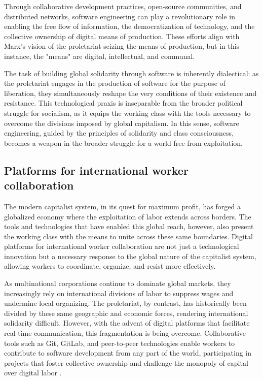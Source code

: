 \begin{refsection}
Through collaborative development practices, open-source communities, and distributed networks, software engineering can play a revolutionary role in enabling the free flow of information, the democratization of technology, and the collective ownership of digital means of production. These efforts align with Marx’s vision of the proletariat seizing the means of production, but in this instance, the "means" are digital, intellectual, and communal.

The task of building global solidarity through software is inherently dialectical: as the proletariat engages in the production of software for the purpose of liberation, they simultaneously reshape the very conditions of their existence and resistance. This technological praxis is inseparable from the broader political struggle for socialism, as it equips the working class with the tools necessary to overcome the divisions imposed by global capitalism. In this sense, software engineering, guided by the principles of solidarity and class consciousness, becomes a weapon in the broader struggle for a world free from exploitation.

\subsection{Platforms for international worker collaboration}

The modern capitalist system, in its quest for maximum profit, has forged a globalized economy where the exploitation of labor extends across borders. The tools and technologies that have enabled this global reach, however, also present the working class with the means to unite across these same boundaries. Digital platforms for international worker collaboration are not just a technological innovation but a necessary response to the global nature of the capitalist system, allowing workers to coordinate, organize, and resist more effectively.

As multinational corporations continue to dominate global markets, they increasingly rely on international divisions of labor to suppress wages and undermine local organizing. The proletariat, by contrast, has historically been divided by these same geographic and economic forces, rendering international solidarity difficult. However, with the advent of digital platforms that facilitate real-time communication, this fragmentation is being overcome. Collaborative tools such as Git, GitLab, and peer-to-peer technologies enable workers to contribute to software development from any part of the world, participating in projects that foster collective ownership and challenge the monopoly of capital over digital labor \cite[pp.~929-931]{marxcapital}.


\end{refsection}

